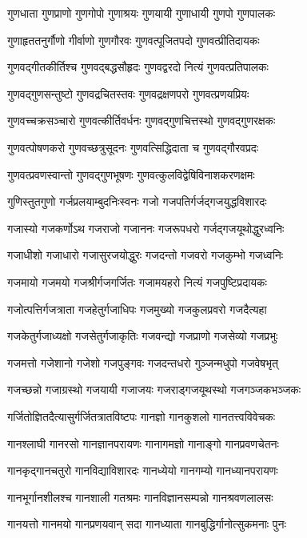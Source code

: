 \twolineshloka
{गुणधाता गुणप्राणो गुणगोपो गुणाश्रयः}%
{गुणयायी गुणाधायी गुणपो गुणपालकः}%

\twolineshloka
{गुणाहृततनुर्गौणो गीर्वाणो गुणगौरवः}%
{गुणवत्पूजितपदो गुणवत्प्रीतिदायकः}%

\twolineshloka
{गुणवद्गीतकीर्तिश्च गुणवद्बद्धसौहृदः}%
{गुणवद्वरदो नित्यं गुणवत्प्रतिपालकः}%

\twolineshloka
{गुणवद्गुणसन्तुष्टो गुणवद्रचितस्तवः}%
{गुणवद्रक्षणपरो गुणवत्प्रणयप्रियः}%

\twolineshloka
{गुणवच्चक्रसञ्चारो गुणवत्कीर्तिवर्धनः}%
{गुणवद्गुणचित्तस्थो गुणवद्गुणरक्षकः}%

\twolineshloka
{गुणवत्पोषणकरो गुणवच्छत्रुसूदनः}%
{गुणवत्सिद्धिदाता च गुणवद्गौरवप्रदः}%

\twolineshloka
{गुणवत्प्रवणस्वान्तो गुणवद्गुणभूषणः}%
{गुणवत्कुलविद्वेषिविनाशकरणक्षमः}%

\twolineshloka
{गुणिस्तुतगुणो गर्जप्रलयाम्बुदनिःस्वनः}%
{गजो गजपतिर्गर्जद्गजयुद्धविशारदः}%

\twolineshloka
{गजास्यो गजकर्णोऽथ गजराजो गजाननः}%
{गजरूपधरो गर्जद्गजयूथोद्धुरध्वनिः}%

\twolineshloka
{गजाधीशो गजाधारो गजासुरजयोद्धुरः}%
{गजदन्तो गजवरो गजकुम्भो गजध्वनिः}%

\twolineshloka
{गजमायो गजमयो गजश्रीर्गजगर्जितः}%
{गजामयहरो नित्यं गजपुष्टिप्रदायकः}%

\twolineshloka
{गजोत्पत्तिर्गजत्राता गजहेतुर्गजाधिपः}%
{गजमुख्यो गजकुलप्रवरो गजदैत्यहा}%

\twolineshloka
{गजकेतुर्गजाध्यक्षो गजसेतुर्गजाकृतिः}%
{गजवन्द्यो गजप्राणो गजसेव्यो गजप्रभुः}%

\twolineshloka
{गजमत्तो गजेशानो गजेशो गजपुङ्गवः}%
{गजदन्तधरो गुञ्जन्मधुपो गजवेषभृत्}%

\twolineshloka
{गजच्छन्नो गजाग्रस्थो गजयायी गजाजयः}%
{गजराड्गजयूथस्थो गजगञ्जकभञ्जकः}%

\twolineshloka
{गर्जितोज्ञितदैत्यासुर्गर्जितत्रातविष्टपः}%
{गानज्ञो गानकुशलो गानतत्त्वविवेचकः}%

\twolineshloka
{गानश्लाघी गानरसो गानज्ञानपरायणः}%
{गानागमज्ञो गानाङ्गो गानप्रवणचेतनः}%

\twolineshloka
{गानकृद्गानचतुरो गानविद्याविशारदः}%
{गानध्येयो गानगम्यो गानध्यानपरायणः}%

\twolineshloka
{गानभूर्गानशीलश्च गानशाली गतश्रमः}%
{गानविज्ञानसम्पन्नो गानश्रवणलालसः}%

\twolineshloka
{गानयत्तो गानमयो गानप्रणयवान् सदा}%
{गानध्याता गानबुद्धिर्गानोत्सुकमनाः पुनः}%

